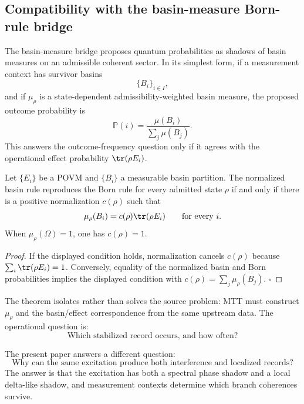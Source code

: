 \documentclass[11pt]{article}
\begin{document}
\subsection{Compatibility with the basin-measure Born-rule bridge}
\label{subsec:compatibility-born-bridge}

The basin-measure bridge proposes quantum probabilities as shadows of basin measures on an
admissible coherent sector. In its simplest form, if a measurement context has survivor basins
\begin{equation}
  \{B_i\}_{i\in I},
\end{equation}
and if \(\mu_\rho\) is a state-dependent admissibility-weighted basin measure, the proposed
outcome probability is
\begin{equation}
  \mathbb P(i)
  =
  \frac{\mu(B_i)}{\sum_j\mu(B_j)}.
  \label{eq:compat-born-basin}
\end{equation}
This answers the outcome-frequency question only if it agrees with the operational effect
probability \(\tr(\rho E_i)\).

\begin{theorem}
\label{thm:basin-born-criterion}
Let \(\{E_i\}\) be a POVM and \(\{B_i\}\) a measurable basin partition. The normalized basin
rule reproduces the Born rule for every admitted state \(\rho\) if and only if there is a
positive normalization \(c(\rho)\) such that
\[
  \mu_\rho(B_i)=c(\rho)\tr(\rho E_i)
  \qquad\text{for every }i.
\]
When \(\mu_\rho(\Omega)=1\), one has \(c(\rho)=1\).
\end{theorem}

\begin{proof}
If the displayed condition holds, normalization cancels \(c(\rho)\) because
\(\sum_i\tr(\rho E_i)=1\). Conversely, equality of the normalized basin and Born
probabilities implies the displayed condition with
\(c(\rho)=\sum_j\mu_\rho(B_j)\). \(\square\)
\end{proof}

The theorem isolates rather than solves the source problem: MTT must construct
\(\mu_\rho\) and the basin/effect correspondence from the same upstream data.
The operational question is:
\begin{equation}
  \text{Which stabilized record occurs, and how often?}
\end{equation}

The present paper answers a different question:
\begin{equation}
  \text{Why can the same excitation produce both interference and localized records?}
\end{equation}
The answer is that the excitation has both a spectral phase shadow and a local delta-like
shadow, and measurement contexts determine which branch coherences survive.
\end{document}
